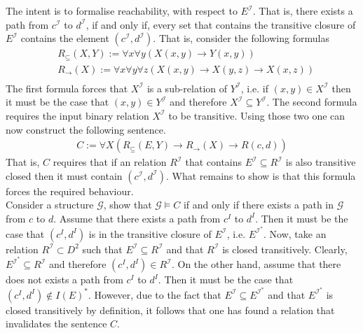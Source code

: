 \documentclass[11pt,a4paper]{article}
\begin{document}
\begin{enumerate}
\begin{enumerate}
The intent is to formalise reachability, with respect to $E^{\mathcal{I}}$. That is, there exists a path from $c^{\mathcal{I}}$ to $d^{\mathcal{I}}$, if and only if, every set that contains the transitive closure of $E^{\mathcal{I}}$ contains the element $(c^{\mathcal{I}}, d^{\mathcal{I}})$.
That is, consider the following formulas
\begin{equation*}
\begin{split}
&R_{\subseteq}(X,Y):= \forall x \forall y (X(x,y) \to Y(x,y)) \\
&R_{\to}(X) := \forall x \forall y \forall z (X(x,y) \to X(y,z) \to X(x,z)) \\
\end{split}
\end{equation*}
The first formula forces that $X^{\mathcal{I}}$ is a sub-relation of $Y^{\mathcal{I}}$, i.e. if $(x,y) \in X^{\mathcal{I}}$ then it must be the case that $(x,y) \in Y^{\mathcal{I}}$ and therefore $X^{\mathcal{I}} \subseteq Y^{\mathcal{I}}$. The second formula requires the input binary relation $X^{\mathcal{I}}$ to be transitive. Using those two one can now construct the following sentence.
\begin{equation*}
\begin{split}
C := \forall X (R_{\subseteq}(E,Y) \to R_{\to}(X) \to R(c,d))
\end{split}
\end{equation*}
That is, $C$ requires that if an relation $R^{\mathcal{I}}$ that contains $E^{\mathcal{I}} \subseteq R^{\mathcal{I}}$ is also transitive closed then it must contain $(c^{\mathcal{I}},d^{\mathcal{I}})$. 
What remains to show is that this formula forces the required behaviour. \\

Consider a structure $\mathcal{G}$, show that $\mathcal{G} \models C$ if and only if there exists a path in $\mathcal{G}$ from $c$ to $d$. Assume that there exists a path from $c^I$ to $d^I$. Then it must be the case that $(c^I,d^I)$ is in the transitive closure of $E^{\mathcal{I}}$, i.e. $E^{\mathcal{I}^*}$. Now, take an relation $R^{\mathcal{I}} \subset D^2$ such that $E^{\mathcal{I}} \subseteq R^{\mathcal{I}}$ and that $R^{\mathcal{I}}$ is closed transitively. Clearly, $E^{\mathcal{I}^* }\subseteq R^{\mathcal{I}}$ and therefore $(c^I, d^I) \in R^{\mathcal{I}}$. On the other hand, assume that there does not exists a path from $c^I$ to $d^I$. Then it must be the case that $(c^I, d^I) \nin I(E)^*$. However, due to the fact that $E^{\mathcal{I}} \subseteq E^{\mathcal{I}^*}$ and that $E^{\mathcal{I}^*}$ is closed transitively by definition, it follows that one has found a relation that invalidates the sentence $C$.


\end{enumerate}
\end{enumerate}
\end{document}
